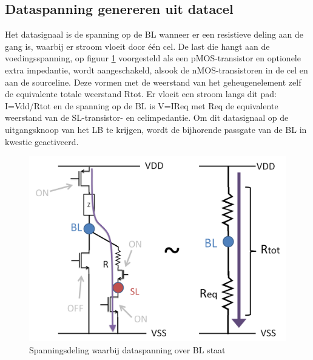 \subsection{Dataspanning genereren uit datacel}
\label{dataread}
Het datasignaal is de spanning op de BL wanneer er een resistieve deling aan de gang is, waarbij er stroom vloeit door één cel. De last die hangt aan de voedingsspanning, op figuur \ref{fig:dataread} voorgesteld als een pMOS-transistor en optionele extra impedantie, wordt aangeschakeld, alsook de nMOS-transistoren in de cel en aan de sourceline. Deze vormen met de weerstand van het geheugenelement zelf de equivalente totale weerstand Rtot. Er vloeit een stroom langs dit pad: I=Vdd/Rtot en de spanning op de BL is V=IReq met Req de equivalente weerstand van de SL-transistor- en celimpedantie. Om dit datasignaal op de uitgangsknoop van het LB te krijgen, wordt de bijhorende passgate van de BL in kwestie geactiveerd.

\begin{figure}
  \centering
  \includegraphics[scale=0.3]{../fig/hfdstk-architecture-datasignal.png}
  \caption[Datasignaal uitlezen]{Spanningsdeling waarbij dataspanning over BL staat}
  \label{fig:dataread}
\end{figure}

